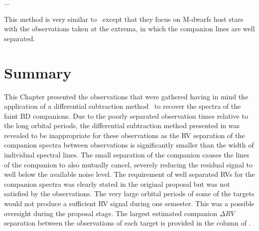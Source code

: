 ...

This method is very similar to~\citet{kostogryz_spectral_2013} except that they focus on M-dwarfs host stars with the observations taken at the extrema, in which the companion lines are well separated. 

\section{Summary}
This Chapter  presented the observations that were gathered having in mind the application of a differential subtraction method~\citep[e.g.,][]{ferluga_separating_1997, kostogryz_spectral_2013} to recover the spectra of the faint {BD} companions.  Due to the poorly separated observation times relative to the long orbital periods, the differential subtraction method presented in  was revealed to be inappropriate for these observations as the {RV} separation of the companion spectra between observations is significantly smaller than the width of individual spectral lines. The small separation of the companion causes the lines of the companion to also mutually cancel, severely reducing the residual signal to well below the available noise level. The requirement of well separated RVs for the companion spectra was clearly stated in the original proposal but was not satisfied by the observations. {\red{} The very large orbital periods of some of the targets would not produce a sufficient {RV} signal during one semester. This was a possible oversight during the proposal stage.} The largest estimated companion \(\Delta {RV}\) separation between the observations of each target is provided in the   column of . 

